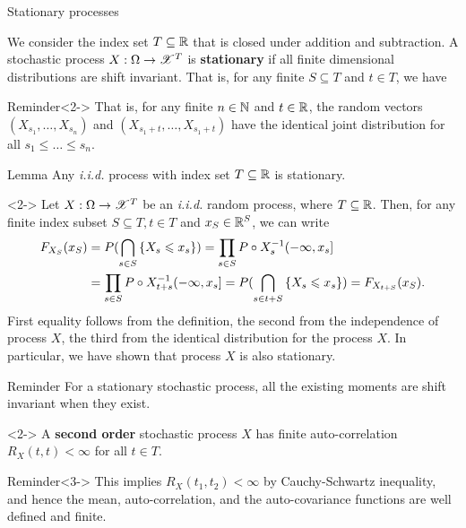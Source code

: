 \documentclass[12pt,aspectratio=169]{beamer}
\begin{document}
\begin{frame}{Stationary processes}
\begin{Definition}
We consider the index set $T \subseteq \mathbb{R}$ that is closed under addition and subtraction.   
A stochastic process $X: \Omega \to \mathscr{X}^T$ is \textbf{stationary} if all finite dimensional distributions are shift invariant. 
That is, for any finite $S \subseteq T$ and $t \in T$, we have 
\end{Definition}
\begin{block}{Reminder}<2->
That is, for any finite $n \in \mathbb{N}$ and $t \in \mathbb{R}$, the random vectors $(X_{s_1}, \dots, X_{s_n})$ and $(X_{s_1+t}, \dots, X_{s_1+t})$ have the identical joint distribution for all $s_1 \le \dots \le s_n$.  
\end{block}
\end{frame}


\begin{frame}
\begin{block}{Lemma} 
Any \emph{i.i.d.} process with index set $T \subseteq \mathbb{R}$ is stationary.
\end{block}

\begin{Proof}<2->
Let $X: \Omega \to \mathscr{X}^T$ be an \emph{i.i.d.} random process, where $T \subseteq \mathbb{R}$. 
Then, for any finite index subset $S \subseteq T, t \in T$ and $x_S \in \mathbb{R}^S$, we can write 
\begin{align*}
F_{X_S}(x_S) 
&= P(\bigcap_{s \in S}\left\{X_s \leqslant x_s\right\}) 
= \prod_{s \in S}P\circ X_s^{-1}(-\infty, x_s] \\
&= \prod_{s \in S}P\circ X_{t+s}^{-1}(-\infty, x_s] 
= P(\bigcap_{s \in t+S}\left\{X_s \leqslant x_s\right\})  
= F_{X_{t+S}}(x_S).
\end{align*}
First equality follows from the definition, the second from the independence of process $X$, 
the third from the identical distribution for the process $X$. 
In particular, we have shown that process $X$ is also stationary. 
\end{Proof}
\end{frame}


\begin{frame}
\begin{block}{Reminder}
For a stationary stochastic process, all the existing moments are shift invariant when they exist.  
\end{block}
\begin{Definition}<2->
A \textbf{second order} stochastic process $X$ has finite auto-correlation $R_X(t,t) < \infty$ for all %
$t \in T$. 
\end{Definition}
\begin{block}{Reminder}<3->
This implies $R_X(t_1, t_2) < \infty$ by Cauchy-Schwartz inequality, 
and hence the mean, auto-correlation, and the auto-covariance functions are well defined and finite. 
\end{block}
\end{frame}
\end{document}

